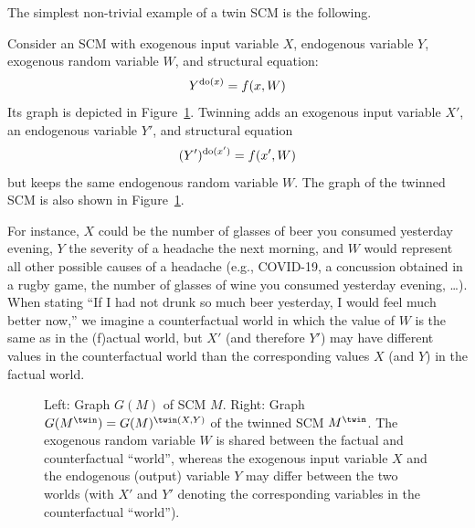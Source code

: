 The simplest non-trivial example of a twin SCM is the following.
\begin{Eg}
  Consider an SCM with exogenous input variable $X$, endogenous variable $Y$, exogenous random variable $W$, and
  structural equation:
  $$Y^{\operatorname{do}(x)} = f(x,W)$$
  Its graph is depicted in Figure~\ref{fig:twin_SCM}.
  Twinning adds an exogenous input variable $X'$, an endogenous variable $Y'$, and structural equation
  $$(Y')^{\operatorname{do}(x')} = f(x',W)$$
  but keeps the same endogenous random variable $W$.
  The graph of the twinned SCM is also shown in Figure~\ref{fig:twin_SCM}.

  For instance, $X$ could be the number of glasses of beer you consumed yesterday evening,
  $Y$ the severity of a headache the next morning, and $W$ would represent all other possible
  causes of a headache (e.g., COVID-19, a concussion obtained in a rugby game, the number of
  glasses of wine you consumed yesterday evening, \dots). When stating 
  ``If I had not drunk so much beer yesterday, I would feel much better now,''
  we imagine a counterfactual world in which the value of $W$ is the same as in the
  (f)actual world, but $X'$ (and therefore $Y'$) may have different values in the
  counterfactual world than the corresponding values $X$ (and $Y$) in the factual world.
  \begin{figure}\centering
    \caption{Left: Graph $G(M)$ of SCM $M$. Right: Graph $G(M^{\twin}) = G(M)^{\twin(X,Y)}$ of the twinned SCM $M^\twin$.
    The exogenous random variable $W$ is shared between the factual and counterfactual ``world'', whereas the exogenous
    input variable $X$ and the endogenous (output) variable $Y$ may differ between the two worlds (with $X'$ and $Y'$ denoting the corresponding variables in the counterfactual ``world'').\label{fig:twin_SCM}}
\end{figure}
\end{Eg}

